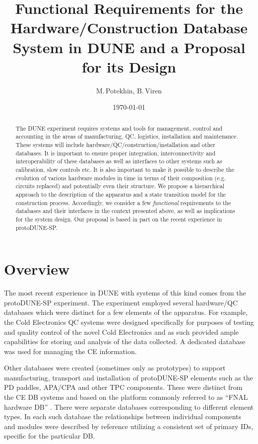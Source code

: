 \documentclass[pdftex,12pt,letter]{article}
\title{Functional Requirements for the Hardware/Construction Database System in DUNE and a Proposal for its Design}
\date{\today}
\author{M.\,Potekhin, B.\,Viren}
\begin{document}
\maketitle

\begin{abstract}
\noindent  The DUNE experiment requires systems and tools for management, control
and accounting  in the areas of manufacturing, QC, logistics, installation and maintenance.
These systems will include hardware/QC/construction/installation and other databases.
It is important to ensure proper integration, interconnectivity and interoperability of these
databases  as well as interfaces to other systems such as calibration, slow controls etc.
It is also important to make it possible to describe the evolution of various hardware modules
in time in terms of their composition (e.g. circuits replaced) and potentially even their structure.
We propose a hierarchical approach to the description of the apparatus and a state transition
model for the construction process. Accordingly, we consider a few \textit{functional}
requirements to the databases and their interfaces  in the context presented above,
as well as implications for the system design.
Our proposal is based in part on the recent experience in protoDUNE-SP.



\end{abstract}


\section{Overview}

The most recent experience in DUNE with systems of this kind comes from the protoDUNE-SP
experiment. The experiment employed several hardware/QC databases which were distinct
for a few elements of the apparatus. For example, the Cold Electronics QC systems were designed specifically
for purposes of testing and quality control of the novel Cold Electronics and as such provided ample capabilities
for storing and analysis of the data collected. A dedicated database was used for managing the CE information.

Other databases were created (sometimes only as prototypes) to support manufacturing, transport and installation of 
protoDUNE-SP elements such as the PD paddles, APA/CPA and other TPC components. These were distinct from
the CE DB systems and based on the platform commonly referred to as ``FNAL hardware DB'' \cite{hardwareDB}.
There were separate databases corresponding to different element types. In each such database the
relationships between individual components and modules were described by reference utilizing a
consistent set of primary IDs, specific for the particular DB.
\end{document}
